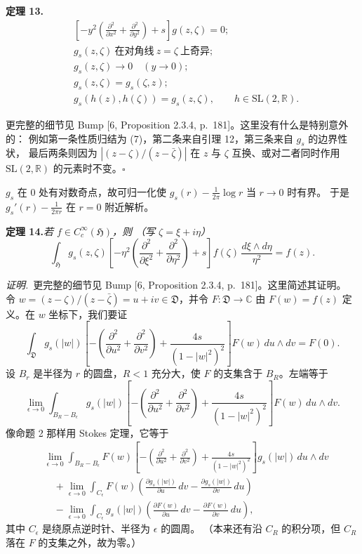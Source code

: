 \par\medskip\noindent\textbf{定理 13.}\quad
\begin{equation}\tag{8}
\begin{aligned}
&\left[-y^{2}\left(\frac{\partial^{2}}{\partial x^{2}}+\frac{\partial^{2}}{\partial y^{2}}\right)+s\right]g(z,\zeta)=0;\\
&g_{s}(z,\zeta)\ \text{在对角线}\ z=\zeta\ \text{上奇异};\\
&g_{s}(z,\zeta)\to0\quad(y\to0);\\
&g_{s}(z,\zeta)=g_{s}(\zeta,z);\\
&g_{s}(h(z),h(\zeta))=g_{s}(z,\zeta),\qquad h\in\mathrm{SL}(2,\mathbb{R}).
\end{aligned}
\end{equation}

\smallskip
更完整的细节见 Bump [6, Proposition 2.3.4, p.\ 181]。这里没有什么是特别意外的：
例如第一条性质归结为 (7)，第二条来自引理 12，第三条来自 $g_{s}$ 的边界性状，
最后两条则因为 $|(z-\zeta)/(z-\bar\zeta)|$ 在 $z$ 与 $\zeta$ 互换、或对二者同时作用
$\mathrm{SL}(2,\mathbb{R})$ 的元素时不变。\hfill$\square$

$g_{s}$ 在 $0$ 处有对数奇点，故可归一化使 $g_{s}(r)-\frac{1}{2\pi}\log r$ 当 $r\to0$ 时有界。
于是 $g_{s}'(r)-\frac{1}{2\pi r}$ 在 $r=0$ 附近解析。

\par\medskip\noindent\textbf{定理 14.}\quad\emph{若 $f\in C_{c}^{\infty}(\mathfrak{H})$，则
（写 $\zeta=\xi+i\eta$）}
\[
\int_{\mathfrak{H}}g_{s}(z,\zeta)\left[-\eta^{2}\left(\frac{\partial^{2}}{\partial\xi^{2}}
+\frac{\partial^{2}}{\partial\eta^{2}}\right)+s\right]f(\zeta)\,\frac{d\xi\wedge d\eta}{\eta^{2}}=f(z).
\]

\smallskip
\noindent\emph{证明.}\ 更完整的细节见 Bump [6, Proposition 2.3.4, p.\ 181]。这里简述其证明。
令 $w=(z-\zeta)/(z-\bar\zeta)=u+iv\in\mathfrak{D}$，并令 $F:\mathfrak{D}\to\mathbb{C}$ 由
$F(w)=f(z)$ 定义。在 $w$ 坐标下，我们要证
\[
\int_{\mathfrak{D}}g_{s}(|w|)\left[-\left(\frac{\partial^{2}}{\partial u^{2}}
+\frac{\partial^{2}}{\partial v^{2}}\right)+\frac{4s}{(1-|w|^{2})^{2}}\right]F(w)\,du\wedge dv=F(0).
\]
设 $B_{r}$ 是半径为 $r$ 的圆盘，$R<1$ 充分大，使 $F$ 的支集含于 $B_{R}$。左端等于
\[
\lim_{\epsilon\to0}\int_{B_{R}-B_{\epsilon}}g_{s}(|w|)
\left[-\left(\frac{\partial^{2}}{\partial u^{2}}+\frac{\partial^{2}}{\partial v^{2}}\right)
+\frac{4s}{(1-|w|^{2})^{2}}\right]F(w)\,du\wedge dv .
\]
像命题 2 那样用 Stokes 定理，它等于
\[
\begin{aligned}
&\lim_{\epsilon\to0}\int_{B_{R}-B_{\epsilon}}F(w)\left[-\left(\frac{\partial^{2}}{\partial u^{2}}
+\frac{\partial^{2}}{\partial v^{2}}\right)+\frac{4s}{(1-|w|^{2})^{2}}\right]g_{s}(|w|)\,du\wedge dv\\
&\quad+\lim_{\epsilon\to0}\int_{C_{\epsilon}}F(w)\left(\frac{\partial g_{s}(|w|)}{\partial u}\,dv
-\frac{\partial g_{s}(|w|)}{\partial v}\,du\right)\\
&\quad-\lim_{\epsilon\to0}\int_{C_{\epsilon}}g_{s}(|w|)\left(\frac{\partial F(w)}{\partial u}\,dv
-\frac{\partial F(w)}{\partial v}\,du\right),
\end{aligned}
\]
其中 $C_{\epsilon}$ 是绕原点逆时针、半径为 $\epsilon$ 的圆周。
（本来还有沿 $C_{R}$ 的积分项，但 $C_{R}$ 落在 $F$ 的支集之外，故为零。）

